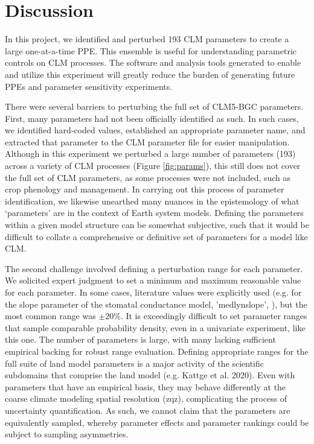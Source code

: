 \documentclass[draft]{agujournal2019}
\begin{document}
\section{Discussion}

In this project, we identified and perturbed 193 CLM parameters to create a large one-at-a-time PPE. This ensemble is useful for understanding parametric controls on CLM processes. The software and analysis tools generated to enable and utilize this experiment will greatly reduce the burden of generating future PPEs and parameter sensitivity experiments.

There were several barriers to perturbing the full set of CLM5-BGC parameters. First, many parameters had not been officially identified as such. In such cases, we identified hard-coded values, established an appropriate parameter name, and extracted that parameter to the CLM parameter file for easier manipulation. Although in this experiment we perturbed a large number of parameters (193) across a variety of CLM processes (Figure \ref{fig:params}), this still does not cover the full set of CLM parameters, as some processes were not included, such as crop phenology and management. In carrying out this process of parameter identification, we  likewise unearthed many nuances in  the epistemology of what  `parameters' are in the context of Earth system models. Defining the parameters within a given model structure can be somewhat subjective, such that it would be difficult to collate a comprehensive or definitive set of parameters for a model like CLM.

The second challenge involved defining a perturbation range for each parameter. We solicited expert judgment to set a minimum and maximum reasonable value for each parameter. In some cases, literature values were explicitly used (e.g. for the slope parameter of the stomatal conductance model, 'medlynslope', ), but the most common range was $\pm20\%$. It is exceedingly difficult to set parameter ranges that sample comparable probability density, even in a univariate experiment, like this one. The number of parameters is large, with many lacking sufficient empirical backing for robust range evaluation. Defining appropriate ranges for the full suite of land model parameters is a major activity of the scientific subdomains that comprise the land model (e.g. Kattge et al. 2020). Even with parameters that have an empirical basis, they may behave differently at the coarse climate modeling spatial resolution (zqz), complicating the process of uncertainty quantification. As such, we cannot claim that the parameters are equivalently sampled, whereby parameter effects and parameter rankings could be subject to sampling asymmetries.
\end{document}

